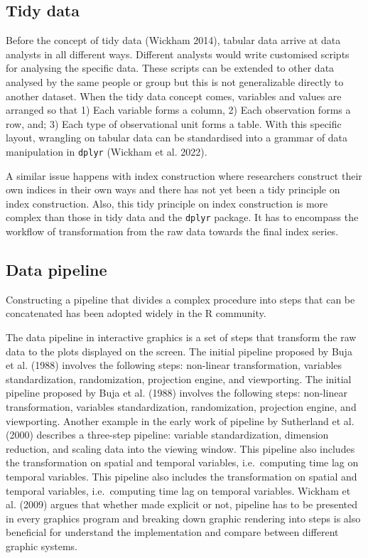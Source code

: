 \documentclass[
]{article}
\begin{document}
\hypertarget{sec-tidy-data}{%
\subsection{Tidy data}\label{sec-tidy-data}}

Before the concept of tidy data (Wickham 2014), tabular data arrive at
data analysts in all different ways. Different analysts would write
customised scripts for analysing the specific data. These scripts can be
extended to other data analysed by the same people or group but this is
not generalizable directly to another dataset. When the tidy data
concept comes, variables and values are arranged so that 1) Each
variable forms a column, 2) Each observation forms a row, and; 3) Each
type of observational unit forms a table. With this specific layout,
wrangling on tabular data can be standardised into a grammar of data
manipulation in \texttt{dplyr} (Wickham et al. 2022).

A similar issue happens with index construction where researchers
construct their own indices in their own ways and there has not yet been
a tidy principle on index construction. Also, this tidy principle on
index construction is more complex than those in tidy data and the
\texttt{dplyr} package. It has to encompass the workflow of
transformation from the raw data towards the final index series.

\hypertarget{sec-data-pipeline}{%
\subsection{Data pipeline}\label{sec-data-pipeline}}

Constructing a pipeline that divides a complex procedure into steps that
can be concatenated has been adopted widely in the R community.

The data pipeline in interactive graphics is a set of steps that
transform the raw data to the plots displayed on the screen. The initial
pipeline proposed by Buja et al. (1988) involves the following steps:
non-linear transformation, variables standardization, randomization,
projection engine, and viewporting. The initial pipeline proposed by
Buja et al. (1988) involves the following steps: non-linear
transformation, variables standardization, randomization, projection
engine, and viewporting. Another example in the early work of pipeline
by Sutherland et al. (2000) describes a three-step pipeline: variable
standardization, dimension reduction, and scaling data into the viewing
window. This pipeline also includes the transformation on spatial and
temporal variables, i.e.~computing time lag on temporal variables. This
pipeline also includes the transformation on spatial and temporal
variables, i.e.~computing time lag on temporal variables. Wickham et al.
(2009) argues that whether made explicit or not, pipeline has to be
presented in every graphics program and breaking down graphic rendering
into steps is also beneficial for understand the implementation and
compare between different graphic systems.
\end{document}
